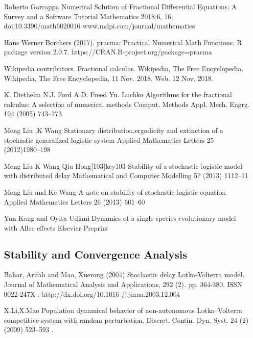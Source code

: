 \begin{thebibliography}{00}
 Roberto Garrappa
\newblock Numerical Solution of Fractional Differential Equations: A Survey and a Software Tutorial
\newblock Mathematics 2018,6, 16; doi:10.3390/math6020016 www.mdpi.com/journal/mathematics

Hans Werner Borchers (2017). 
\newblock pracma: Practical Numerical Math Functions. 
\newblock R package version 2.0.7. https://CRAN.R-project.org/package=pracma

 Wikipedia contributors. 
\newblock Fractional calculus.
\newblock Wikipedia, The Free Encyclopedia. Wikipedia, The Free Encyclopedia, 11 Nov. 2018. Web. 12 Nov. 2018. 

K. Diethelm N.J. Ford A.D. Freed Yu. Luchko
\newblock Algorithms for the fractional calculus: A selection of numerical methods
\newblock Comput. Methods Appl. Mech. Engrg. 194 (2005) 743–773

 Meng Liu ,K Wang
\newblock Stationary distribution,ergodicity and extinction of a stochastic generalized logistic system
\newblock Applied Mathematics Letters 25 (2012)1980–198

Meng Liu K Wang Qiu Hong[103]{key103} 
\newblock Stability of a stochastic logistic model with distributed delay
\newblock Mathematical and Computer Modelling 57 (2013) 1112–11

Meng Liu and  Ke Wang
\newblock A note on stability of stochastic logistic equation
\newblock Applied Mathematics Letters 26 (2013) 601–60

 Yun Kang and Oyita Udiani
\newblock Dynamics of a single species evolutionary model with Allee effects
\newblock Elsevier Preprint

\subsection{Stability and Convergence Analysis}

Bahar, Arifah and Mao, Xuerong (2004) 
\newblock Stochastic delay Lotka-Volterra model. 
\newblock Journal of Mathematical Analysis and Applications, 292 (2). pp. 364-380. ISSN 0022-247X , http://dx.doi.org/10.1016
/j.jmaa.2003.12.004

 X.Li,X.Mao
\newblock Population dynamical behavior of non-autonomous Lotka–Volterra competitive system with random perturbation, 
\newblock Discret. Contin. Dyn. Syst. 24 (2) (2009) 523–593 .


\end{thebibliography}
